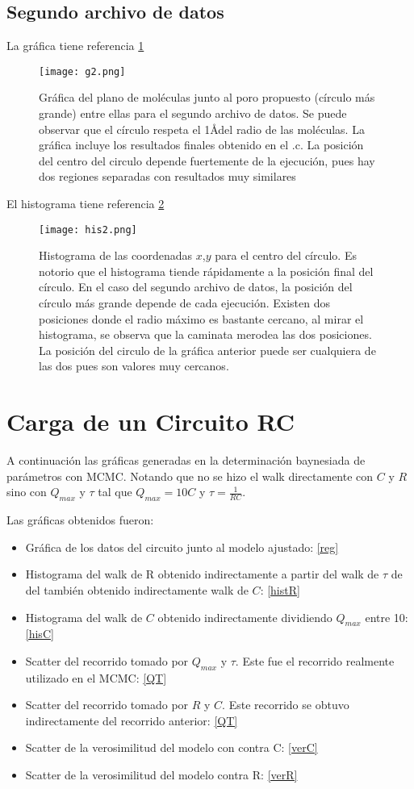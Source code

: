 ﻿\documentclass[notitlepage,letterpaper,12pt]{article} %
\begin{document}
\newpage

\subsection{Segundo archivo de datos}
La gráfica tiene referencia \ref{g1d2}

\begin{figure}[h]
  \centering
   \texttt{[image: g2.png]}
  \caption{Gráfica del plano de moléculas junto al poro propuesto (círculo más grande) entre ellas para el segundo archivo de datos. Se puede observar que el círculo respeta el 1\AA  del radio de las moléculas. La gráfica incluye los resultados finales obtenido en el .c. La posición del centro del circulo depende fuertemente de la ejecución, pues hay dos regiones separadas con resultados muy similares}
  \label{g1d2}
\end{figure}
\newpage
El histograma tiene referencia \ref{his2}
\begin{figure}[h!]
  \centering
   \texttt{[image: his2.png]}
  \caption{Histograma de las coordenadas $x$,$y$ para el centro del círculo. Es notorio que el histograma tiende rápidamente a la posición final del círculo. En el caso del segundo archivo de datos, la posición del círculo más grande depende de cada ejecución. Existen dos posiciones donde el radio máximo es bastante cercano, al mirar el histograma, se observa que la caminata merodea las dos posiciones. La posición del circulo de la gráfica anterior puede ser cualquiera de las dos pues son valores muy cercanos. }
  \label{his2}
\end{figure}

\newpage
\section{Carga de un Circuito RC}
A continuación las gráficas generadas en la determinación baynesiada de parámetros con MCMC.
Notando que no se hizo el walk directamente con $C$ y $R$ sino con $Q_{max}$ y $\tau$ tal que $Q_{max} = 10C$ y $\tau = \frac{1}{RC}$.

Las gráficas obtenidos fueron:
\begin{itemize}
\item Gráfica de los datos del circuito junto al modelo ajustado: \ref{reg}
\item Histograma del walk de R obtenido indirectamente a partir del walk de $\tau$ de del también obtenido indirectamente walk de $C$: \ref{histR}
\item Histograma del walk de $C$ obtenido indirectamente dividiendo $Q_{max}$ entre 10: \ref{hisC} 
\item Scatter del recorrido tomado por $Q_{max}$ y $\tau$. Este fue el recorrido realmente utilizado en el MCMC: \ref{QT}
\item Scatter del recorrido tomado por $R$ y $C$. Este recorrido se obtuvo indirectamente del recorrido anterior: \ref{QT}
\item Scatter de la verosimilitud del modelo con contra C: \ref{verC}
\item Scatter de la verosimilitud del modelo contra R: \ref{verR}
\end{itemize}
\end{document}
